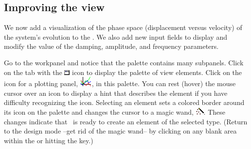 
\subsection{Improving the view}\label{section:03ExplorationJavascriptModifyingView}
We now add a visualization of the phase space (displacement versus velocity) of the system's evolution to the
. We also add new input fields to display and modify the value of the damping, amplitude, and frequency parameters.

Go to the  workpanel and notice that the  palette contains many subpanels.  Click on the tab
with the \includegraphics[scale=\linescale]{../_common/icons_png/Groups/Containers.png} icon to display the  palette of view elements.  Click on the icon for a plotting panel,
\includegraphics[scale=\linescale]{../_common/icons_png/Elements/PlottingPanel.png}, in this palette. You can rest (hover) the mouse
cursor over an icon to display a hint that describes the element if you have difficulty recognizing the icon.
Selecting an element sets a colored border around its icon on the palette and changes the cursor to a magic wand,
\includegraphics[scale=\linescale]{../_common/icons_png/create.png}. These changes indicate that \ejs\ is ready to create
an element of the selected type. (Return to the design mode --get rid of the magic wand-- by clicking on any
blank area within the  or hitting the  key.)

